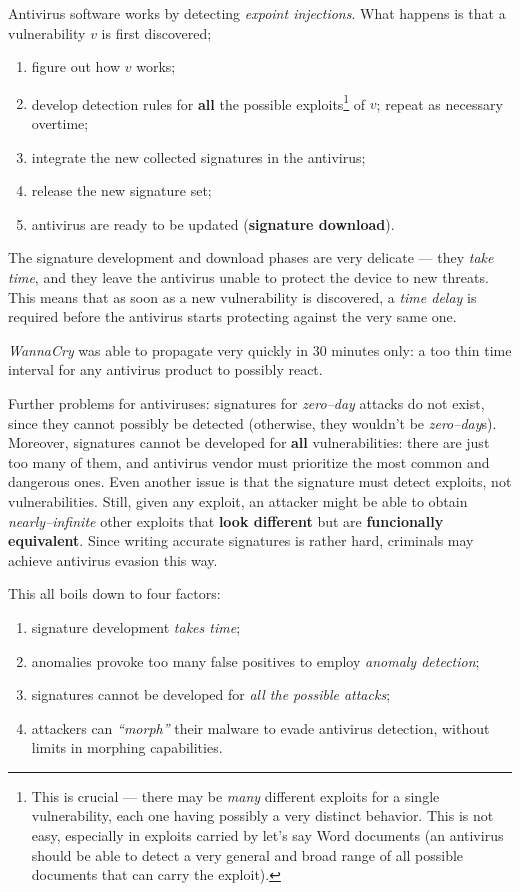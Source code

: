 \documentclass[10pt]{extreport}
\begin{document}
Antivirus software works by detecting \emph{expoint injections}. What happens is that a vulnerability $v$ is first discovered; 
\begin{enumerate}
    \item figure out how $v$ works;
    \item develop detection rules for \textbf{all} the possible
        exploits\footnote{This is crucial --- there may be \emph{many} different
        exploits for a single vulnerability, each one having possibly a very
    distinct behavior. This is not easy, especially in exploits carried by
let's say Word documents (an antivirus should be able to detect a very general
and broad range of all possible documents that can carry the exploit).} of $v$;
repeat as necessary overtime; 
    \item integrate the new collected signatures in the antivirus;
    \item release the new signature set;
    \item antivirus are ready to be updated (\textbf{signature download}).
\end{enumerate}

The signature development and download phases are very delicate --- they
\emph{take time}, and they leave the antivirus unable to protect the device to
new threats. This means that as soon as a new vulnerability is discovered, a
\emph{time delay} is required before the antivirus starts protecting against
the very same one. 

\emph{WannaCry} was able to propagate very quickly in 30 minutes only: a too
thin time interval for any antivirus product to possibly react.

Further problems for antiviruses: signatures for \emph{zero--day} attacks do
not exist, since they cannot possibly be detected (otherwise, they wouldn't be
\emph{zero--day}s). Moreover, signatures cannot be developed for \textbf{all}
vulnerabilities: there are just too many of them, and antivirus vendor must
prioritize the most common and dangerous ones. Even another issue is that the
signature must detect exploits, not vulnerabilities. Still, given any
exploit, an attacker might be able to obtain \emph{nearly--infinite} other
exploits that \textbf{look different} but are \textbf{funcionally equivalent}.
Since writing accurate signatures is rather hard, criminals may achieve
antivirus evasion this way.

This all boils down to four factors:
\begin{enumerate}
    \item signature development \emph{takes time};
    \item anomalies provoke too many false positives to employ \emph{anomaly
        detection};
    \item signatures cannot be developed for \emph{all the possible attacks};
    \item attackers can \emph{``morph''} their malware to evade antivirus
        detection, without limits in morphing capabilities.
\end{enumerate}
\end{document}
